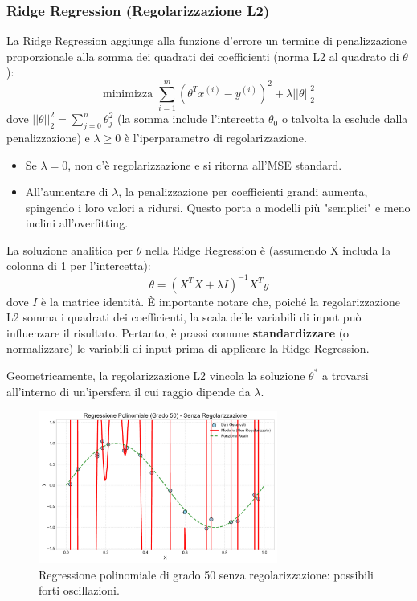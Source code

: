 \documentclass{article}
\begin{document}
\subsubsection{Ridge Regression (Regolarizzazione L2)}
La Ridge Regression aggiunge alla funzione d'errore un termine di penalizzazione proporzionale alla somma dei quadrati dei coefficienti (norma L2 al quadrato di $\theta$):
$$ \text{minimizza } \sum_{i=1}^{m} (\theta^T x^{(i)} - y^{(i)})^2 + \lambda ||\theta||_2^2 $$
dove $||\theta||_2^2 = \sum_{j=0}^{n} \theta_j^2$ (la somma include l'intercetta $\theta_0$ o talvolta la esclude dalla penalizzazione) e $\lambda \ge 0$ è l'iperparametro di regolarizzazione.
\begin{itemize}
    \item Se $\lambda = 0$, non c'è regolarizzazione e si ritorna all'MSE standard.
    \item All'aumentare di $\lambda$, la penalizzazione per coefficienti grandi aumenta, spingendo i loro valori a ridursi. Questo porta a modelli più "semplici" e meno inclini all'overfitting.
\end{itemize}
La soluzione analitica per $\theta$ nella Ridge Regression è (assumendo X includa la colonna di 1 per l'intercetta):
$$ \theta = (X^T X + \lambda I)^{-1} X^T y $$
dove $I$ è la matrice identità. È importante notare che, poiché la regolarizzazione L2 somma i quadrati dei coefficienti, la scala delle variabili di input può influenzare il risultato. Pertanto, è prassi comune \textbf{standardizzare} (o normalizzare) le variabili di input prima di applicare la Ridge Regression.

Geometricamente, la regolarizzazione L2 vincola la soluzione $\theta^*$ a trovarsi all'interno di un'ipersfera il cui raggio dipende da $\lambda$.

\begin{figure}[H]
    \centering
    \includegraphics[width=0.7\textwidth]{images/poly50_no_reg.pdf}
    \caption{Regressione polinomiale di grado 50 senza regolarizzazione: possibili forti oscillazioni.}
    \label{fig:poly50_no_reg}
\end{figure}
\end{document}
